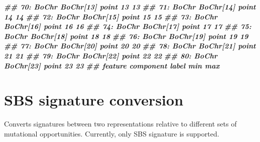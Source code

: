 \documentclass[
  12pt,
  a4paper,
  twoside]{book}
\newenvironment{Shaded}{\begin{snugshade}}{\end{snugshade}}
\newcommand{\DocumentationTok}[1]{\textcolor[rgb]{0.56,0.35,0.01}{\textbf{\textit{#1}}}}
\begin{document}
\begin{Shaded}
\begin{Highlighting}[]
\DocumentationTok{\#\# 70:   BoChr         BoChr[13] point   13  13}
\DocumentationTok{\#\# 71:   BoChr         BoChr[14] point   14  14}
\DocumentationTok{\#\# 72:   BoChr         BoChr[15] point   15  15}
\DocumentationTok{\#\# 73:   BoChr         BoChr[16] point   16  16}
\DocumentationTok{\#\# 74:   BoChr         BoChr[17] point   17  17}
\DocumentationTok{\#\# 75:   BoChr         BoChr[18] point   18  18}
\DocumentationTok{\#\# 76:   BoChr         BoChr[19] point   19  19}
\DocumentationTok{\#\# 77:   BoChr         BoChr[20] point   20  20}
\DocumentationTok{\#\# 78:   BoChr         BoChr[21] point   21  21}
\DocumentationTok{\#\# 79:   BoChr         BoChr[22] point   22  22}
\DocumentationTok{\#\# 80:   BoChr         BoChr[23] point   23  23}
\DocumentationTok{\#\#     feature         component label  min max}
\end{Highlighting}
\end{Shaded}

\hypertarget{convert}{%
\chapter{SBS signature conversion}\label{convert}}

Converts signatures between two representations relative to different sets of mutational opportunities. Currently, only SBS signature is supported.
\end{document}
